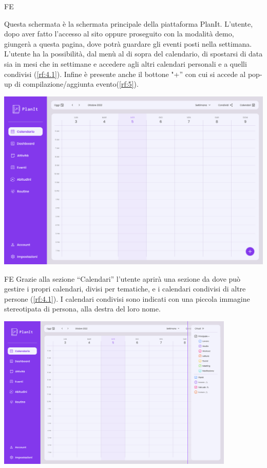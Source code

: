 \begin{listaPersonale}{FE}
    \pagebreak%
    
     Questa schermata è la schermata principale della piattaforma PlanIt. L’utente, dopo aver fatto l’accesso al sito oppure proseguito con la modalità demo, giungerà a questa pagina, dove potrà guardare gli eventi posti nella settimana. L’utente ha la possibilità, dal menù al di sopra del calendario, di spostarsi di data sia in mesi che in settimane e accedere agli altri calendari personali e a quelli condivisi (\ref{rf:4.1}). Infine è presente anche il bottone "+” con cui si accede al pop-up di compilazione/aggiunta evento(\ref{rf:5}).
    \begin{center}
        \includegraphics[width=1\textwidth]{img/FrontEnd/Calendar/Calendar.png}
    \end{center}
    
    \begin{listaPersonale2}{FE}
         Grazie alla sezione “Calendari” l’utente aprirà una sezione da dove può gestire i propri calendari, divisi per tematiche, e i calendari condivisi di altre persone (\ref{rf:4.1}). I calendari condivisi sono indicati con una piccola immagine stereotipata di persona, alla destra del loro nome.
    \end{listaPersonale2}
    \begin{center}
        \includegraphics[width=0.85\textwidth,height=0.30\textheight]{img/FrontEnd/Calendar/CalendarCondivisi.png}
    \end{center}


\end{listaPersonale}
